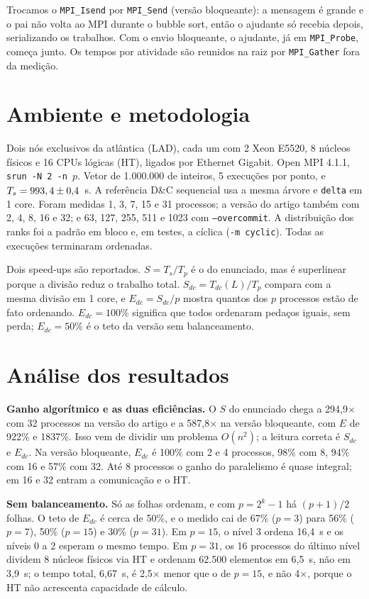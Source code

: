 \documentclass[10pt,twocolumn]{article}
\begin{document}
Trocamos o \texttt{MPI\_Isend} por \texttt{MPI\_Send} (versão bloqueante): a
mensagem é grande e o pai não volta ao MPI durante o bubble sort, então o
ajudante só recebia depois, serializando os trabalhos. Com o envio bloqueante,
o ajudante, já em \texttt{MPI\_Probe}, começa junto. Os tempos por atividade
são reunidos na raiz por \texttt{MPI\_Gather} fora da medição.

\section{Ambiente e metodologia}

Dois nós exclusivos da atlântica (LAD), cada um com 2 Xeon E5520, 8 núcleos
físicos e 16 CPUs lógicas (HT), ligados por Ethernet Gigabit. Open MPI 4.1.1,
\texttt{srun -N 2 -n $p$}. Vetor de 1.000.000 de inteiros, 5 execuções por ponto,
e $T_s = 993,4 \pm 0{,}4$~s. A referência D\&C sequencial usa a mesma árvore e
\texttt{delta} em 1 core. Foram medidas 1, 3, 7, 15 e 31 processos; a versão do
artigo também com 2, 4, 8, 16 e 32; e 63, 127, 255, 511 e 1023 com
\texttt{--overcommit}. A distribuição dos ranks foi a padrão em bloco e, em
testes, a cíclica (\texttt{-m cyclic}). Todas as execuções terminaram ordenadas.

Dois speed-ups são reportados. $S = T_s/T_p$ é o do enunciado, mas é superlinear
porque a divisão reduz o trabalho total. $S_{dc} = T_{dc}(L)/T_p$ compara com a
mesma divisão em 1 core, e $E_{dc} = S_{dc}/p$ mostra quantos dos $p$ processos
estão de fato ordenando. $E_{dc}=100\%$ significa que todos ordenaram pedaços
iguais, sem perda; $E_{dc}=50\%$ é o teto da versão sem balanceamento.

\section{Análise dos resultados}

\textbf{Ganho algorítmico e as duas eficiências.} O $S$ do enunciado chega a
294,9$\times$ com 32 processos na versão do artigo e a 587,8$\times$ na versão
bloqueante, com $E$ de 922\% e 1837\%. Isso vem de dividir um problema
$O(n^2)$; a leitura correta é $S_{dc}$ e $E_{dc}$. Na versão bloqueante, $E_{dc}$
é 100\% com 2 e 4 processos, 98\% com 8, 94\% com 16 e 57\% com 32. Até 8
processos o ganho do paralelismo é quase integral; em 16 e 32 entram a
comunicação e o HT.

\textbf{Sem balanceamento.} Só as folhas ordenam, e com $p=2^k-1$ há $(p+1)/2$
folhas. O teto de $E_{dc}$ é cerca de 50\%, e o medido cai de 67\% ($p=3$) para
56\% ($p=7$), 50\% ($p=15$) e 30\% ($p=31$). Em $p=15$, o nível 3 ordena
16,4~s e os níveis 0 a 2 esperam o mesmo tempo. Em $p=31$, os 16 processos do último nível
dividem 8 núcleos físicos via HT e ordenam 62.500 elementos em 6,5~s, não em
3,9~s; o tempo total, 6,67~s, é 2,5$\times$ menor que o de $p=15$, e não
4$\times$, porque o HT não acrescenta capacidade de cálculo.
\end{document}
